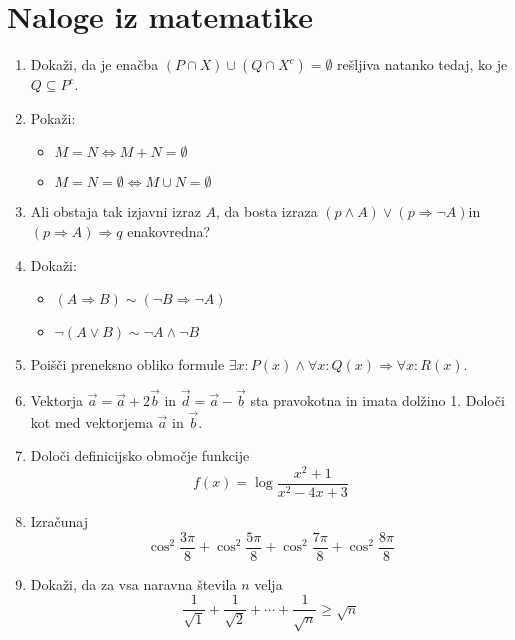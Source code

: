 \documentclass[a4paper,12pt]{article}
\begin{document}
\section {Naloge iz matematike}

\begin{enumerate}
    \item Dokaži, da je enačba \((P \cap X) \cup (Q \cap X^{c}) = \emptyset\) rešljiva natanko tedaj, ko je \(Q \subseteq P^{c}\).

    \item {
        Pokaži: 
        \begin{itemize}
            \item  \(M = N \iff M + N = \emptyset\)
            \item \(M = N = \emptyset \iff M \cup N = \emptyset\)
        \end{itemize}
   }

    \item Ali obstaja tak izjavni izraz \(A\), da bosta izraza \((p \wedge A) \lor (p \Rightarrow \neg{A})\)in \((p \Rightarrow A) \Rightarrow q\) enakovredna?


    \item {
        Dokaži:
        \begin{itemize}
            \item \((A \Rightarrow B) \sim (\neg{B} \Rightarrow \neg{A})\)
            \item \(\neg{(A \vee B)} \sim \neg{A} \wedge \neg{B}\)
        \end{itemize}
    }

    \item Poišči preneksno obliko formule \(\exists{x} : P(x) \wedge \forall{x} : Q(x) \Rightarrow \forall{x} : R(x)\).

    \item Vektorja \(\vec{a} = \vec{a} + 2\vec{b}\) in \(\vec{d} = \vec{a} - \vec{b}\) sta pravokotna in imata dolžino 1. Določi kot med vektorjema \(\vec{a}\) in \(\vec{b}\).

    \item Določi definicijsko območje funkcije 
        \[f(x) = \log{\frac{x^2 + 1}{x^2 - 4x + 3}}\]

    \item Izračunaj 
    \[
        \cos^2\frac{3\pi}{8} + \cos^2\frac{5\pi}{8} + \cos^2\frac{7\pi}{8} + \cos^2\frac{8\pi}{8}
    \]

    \item Dokaži, da za vsa naravna števila $n$ velja
         \[
            \frac{1}{\sqrt{1}} + \frac{1}{\sqrt{2}} + \cdots{} + \frac{1}{\sqrt{n}} \geq \sqrt{n}
         \]


\end{enumerate}
\end{document}
